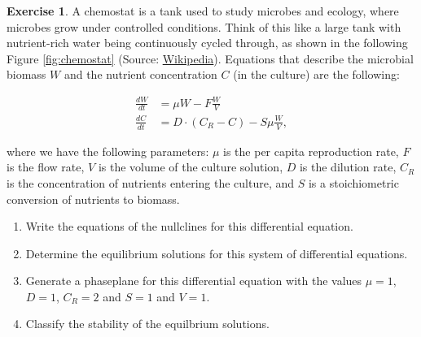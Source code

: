 \documentclass[
]{book}
\theoremstyle{definition}
\theoremstyle{definition}
\theoremstyle{definition}
\newtheorem{exercise}{Exercise}[chapter]
\theoremstyle{remark}
\begin{document}
\begin{exercise}
\protect\hypertarget{exr:unnamed-chunk-111}{}{\label{exr:unnamed-chunk-111} }A chemostat is a tank used to study microbes and ecology, where microbes grow under controlled conditions. Think of this like a large tank with nutrient-rich water being continuously cycled through, as shown in the following Figure \ref{fig:chemostat} (Source: \href{https://en.wikipedia.org/wiki/Chemostat}{Wikipedia}). Equations that describe the microbial biomass \(W\) and the nutrient concentration \(C\) (in the culture) are the following:

\begin{align}
\frac{dW}{dt} &= \mu W - F \frac{W}{V} \\
\frac{dC}{dt} &= D \cdot (C_{R}-C) - S \mu \frac{W}{V},
\end{align}

where we have the following parameters: \(\mu\) is the per capita reproduction rate, \(F\) is the flow rate, \(V\) is the volume of the culture solution, \(D\) is the dilution rate, \(C_{R}\) is the concentration of nutrients entering the culture, and \(S\) is a stoichiometric conversion of nutrients to biomass.

\begin{enumerate}[label=\alph*.]
 \item Write the equations of the nullclines for this differential equation.
 \item Determine the equilibrium solutions for this system of differential equations.
 \item Generate a phaseplane for this differential equation with the values $\mu=1$, $D=1$, $C_{R}=2$ and $S=1$ and $V=1$.
 \item Classify the stability of the equilbrium solutions.
 \end{enumerate}
\end{exercise}

~
\end{document}

